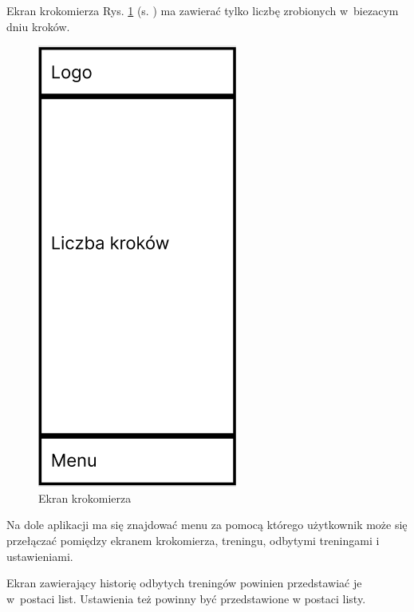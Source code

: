 Ekran krokomierza Rys. \ref{rys:rysunek003} (s. \pageref{rys:rysunek003}) ma zawierać tylko liczbę zrobionych w~biezacym dniu kroków.

\begin{figure}[!htb]
	\centering
	\includegraphics[width=.2\linewidth]{rys/ekran_krokomierza.png}
	\caption{Ekran krokomierza}
	\label{rys:rysunek003}
\end{figure}

Na dole aplikacji ma się znajdować menu za pomocą którego użytkownik może się przełączać pomiędzy ekranem krokomierza, treningu, odbytymi treningami i ustawieniami.

Ekran zawierający historię odbytych treningów powinien przedstawiać je w~postaci list. Ustawienia też powinny być przedstawione w postaci listy. 
 